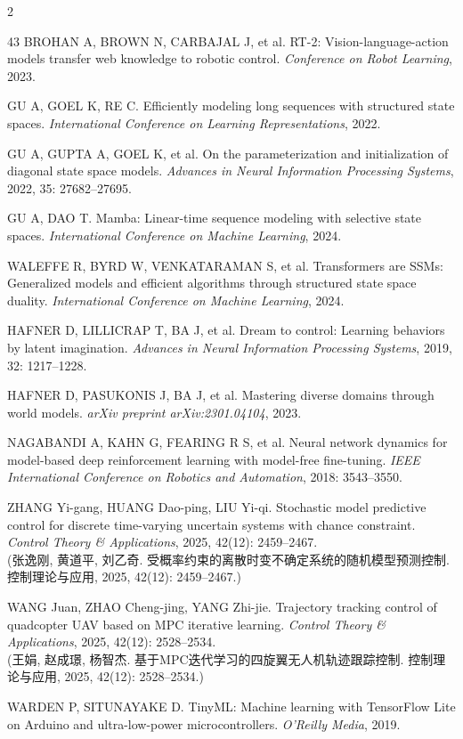\begin{multicols}{2}
{\begin{thebibliography}{43}
BROHAN A, BROWN N, CARBAJAL J, et al. RT-2: Vision-language-action models transfer web knowledge to robotic control. {\it Conference on Robot Learning}, 2023.

GU A, GOEL K, RE C. Efficiently modeling long sequences with structured state spaces. {\it International Conference on Learning Representations}, 2022.

GU A, GUPTA A, GOEL K, et al. On the parameterization and initialization of diagonal state space models. {\it Advances in Neural Information Processing Systems}, 2022, 35: 27682--27695.

GU A, DAO T. Mamba: Linear-time sequence modeling with selective state spaces. {\it International Conference on Machine Learning}, 2024.

WALEFFE R, BYRD W, VENKATARAMAN S, et al. Transformers are SSMs: Generalized models and efficient algorithms through structured state space duality. {\it International Conference on Machine Learning}, 2024.

HAFNER D, LILLICRAP T, BA J, et al. Dream to control: Learning behaviors by latent imagination. {\it Advances in Neural Information Processing Systems}, 2019, 32: 1217--1228.

HAFNER D, PASUKONIS J, BA J, et al. Mastering diverse domains through world models. {\it arXiv preprint arXiv:2301.04104}, 2023.

NAGABANDI A, KAHN G, FEARING R S, et al. Neural network dynamics for model-based deep reinforcement learning with model-free fine-tuning. {\it IEEE International Conference on Robotics and Automation}, 2018: 3543--3550.

ZHANG Yi-gang, HUANG Dao-ping, LIU Yi-qi. Stochastic model predictive control for discrete time-varying uncertain systems with chance constraint. {\it Control Theory \& Applications}, 2025, 42(12): 2459--2467.\\(张逸刚, 黄道平, 刘乙奇. 受概率约束的离散时变不确定系统的随机模型预测控制. 控制理论与应用, 2025, 42(12): 2459--2467.)

WANG Juan, ZHAO Cheng-jing, YANG Zhi-jie. Trajectory tracking control of quadcopter UAV based on MPC iterative learning. {\it Control Theory \& Applications}, 2025, 42(12): 2528--2534.\\(王娟, 赵成璟, 杨智杰. 基于MPC迭代学习的四旋翼无人机轨迹跟踪控制. 控制理论与应用, 2025, 42(12): 2528--2534.)

WARDEN P, SITUNAYAKE D. TinyML: Machine learning with TensorFlow Lite on Arduino and ultra-low-power microcontrollers. {\it O'Reilly Media}, 2019.


\end{thebibliography}}
\end{multicols}
